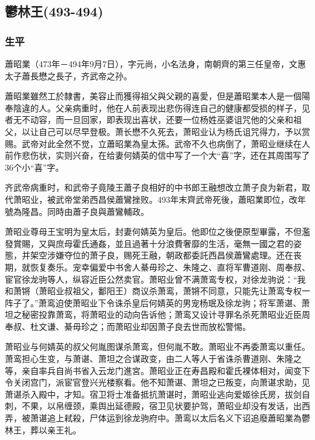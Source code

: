 
\subsection{鬱林王\tiny(493-494)}

\subsubsection{生平}

蕭昭業（473年－494年9月7日），字元尚，小名法身，南朝齊的第三任皇帝，文惠太子蕭長懋之長子，齐武帝之孙。

蕭昭業雖然工於隸書，美容止而獲得祖父與父親的喜愛，但是蕭昭業本人是一個陽奉陰違的人。父亲病重时，他在人前表现出悲伤得连自己的健康都受损的样子，见者无不动容，而一旦回家，即表现出喜状，还要一位杨姓巫婆诅咒他的父亲和祖父，以让自己可以尽早登极。萧长懋不久死去，萧昭业认为杨氏诅咒得力，予以赏赐。武帝对此全然不觉，立蕭昭業為皇太孫。武帝不久也病倒了，萧昭业继续在人前作悲伤状，实则兴奋，在给妻何婧英的信中写了一个大“喜”字，还在其周围写了36个小“喜”字。

齐武帝病重时，和武帝子竟陵王蕭子良相好的中书郎王融想改立萧子良为新君，取代萧昭业，被武帝堂弟西昌侯蕭鸞挫败。493年末齊武帝死後，蕭昭業即位，改年號為隆昌。同時由蕭子良與蕭鸞輔政。

萧昭业尊母王宝明为皇太后，封妻何婧英为皇后。他即位之後便原型畢露，不但濫發賞賜，又與庶母霍氏通姦，並且過著十分浪費奢靡的生活，毫無一國之君的姿態，并架空涉嫌夺位的萧子良，赐死王融，朝政都委託西昌侯蕭鸞處理。还在丧期，就恢复奏乐。宠幸偏爱中书舍人綦毋珍之、朱隆之、直将军曹道刚、周奉叔、宦官徐龙驹等人，纵容近臣公然卖官。萧昭业曾不满萧鸾专权，对徐龙驹说：“我和萧锵（萧昭业叔祖父，鄱阳王）商议杀萧鸾，萧锵不同意，只能先让萧鸾专权一阵子了。”萧鸾迫使萧昭业下令诛杀皇后何婧英的男宠杨珉及徐龙驹；将军萧谌、萧坦之秘密投靠萧鸾，将萧昭业的动向告诉他；萧鸾又设计寻罪名杀死萧昭业近臣周奉叔、杜文谦、綦毋珍之；而萧昭业却因萧子良去世而放松警惕。

萧昭业与何婧英的叔父何胤图谋杀萧鸾，但何胤不敢。萧昭业不再委萧鸾以重任。萧鸾担心生变，与萧谌、萧坦之合谋政变，由二人等人于省诛杀曹道刚、朱隆之等，亲自率兵自尚书省入云龙门進宮。萧昭业正在寿昌殿和霍氏裸体相对，闻变下令关闭宫门，派宦官登兴光楼察看。他不知萧谌、萧坦之已叛变，向萧谌求助，见萧谌杀入殿中，才知。宿卫将士准备抵抗萧谌时，萧昭业逃向爱姬徐氏房，拔剑自刺，不果，以帛缠颈，乘舆出延德殿，宿卫见状要护驾，萧昭业却没有发话，出西弄，被萧谌追上弒殺，尸体运到徐龙驹府中。萧鸾以太后名义下诏追廢蕭昭業為鬱林王，葬以亲王礼。

